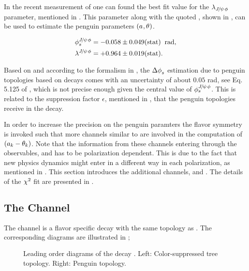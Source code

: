 In the recent \lhcb measurement \cite{phis-3fb-paper} of \phis one can found the best fit value for the $\lambda_{{J\mskip -3mu/\mskip -2mu\psi\mskip 2mu}\phi}$
parameter, mentioned in . This parameter along with the quoted \phis, shown in ,
can be used to estimate the penguin parameters $(a_{},\theta_{})$.

\begin{subequations}
  \label{phis_lambda_result}
  \begin{align}
    \centering
    \phis^{\jpsi\phi}     &=  -0.058 \pm 0.049(\text{stat})  \;\; \text{rad},\\
    \lambda^{\jpsi\phi}   &=  +0.964 \pm 0.019(\text{stat}).
  \end{align}
\end{subequations}

\noindent Based on  and according to the formalism in , the $\Delta\phi_{s}^{}$ estimation
due to penguin topologies based on \BsJpsiPhi decays comes with an uncertainty of about $0.05$ rad, see Eq. 5.125 of \cite{DeBruyn-thesis}, which is not precise
enough given the central value of $\phi_{s}^{{J\mskip -3mu/\mskip -2mu\psi\mskip 2mu}\phi}$. This is related to the suppression factor $\epsilon$, mentioned in
, that the penguin topologies receive in the \BsJpsiPhi decay.

In order to increase the precision on the penguin paramters the \grpsuthree flavor symmetry is 
invoked such that more channels similar to \BsJpsiPhi are involved in the computation of $(a_k-\theta_k)$.
Note that the information from these channels entering through the observables,  and 
has to be polarization dependent. This is due to the fact that new physics dynamics might enter in a different way in each polarization,
as mentioned in \cite{DeBruyn-thesis}.
This section introduces the additional channels, \BsJpsiKst and \BdJpsiRho. The details of the $\chi^2$ fit are presented in .


\subsection{The \BsJpsiKst Channel}
\label{bsjpsikst_chanell}

The \BsJpsiKst channel is a flavor specific decay with the same topology as \BsJpsiPhi. The corresponding
diagrams are illustrated in ;

\begin{figure}[h]
  \centering
  \scalebox{0.9}{\sffamily }
  \caption{Leading order diagrams of the decay \BsJpsiKst. Left: Color-suppressed tree topology. Right: Penguin topology.}
  \label{bs2jpsikst}
\end{figure}

